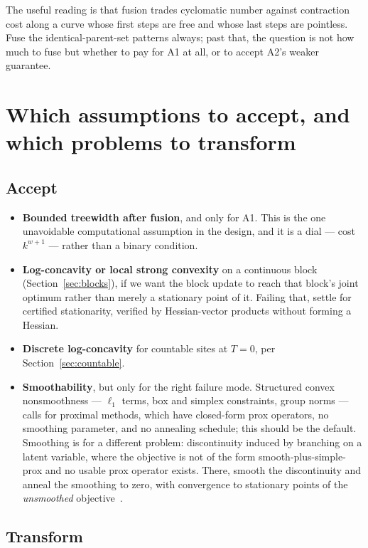 The useful reading is that fusion trades cyclomatic number against contraction cost along a curve whose first steps are free and whose last steps are pointless. Fuse the identical-parent-set patterns always; past that, the question is not how much to fuse but whether to pay for A1 at all, or to accept A2's weaker guarantee.

\section{Which assumptions to accept, and which problems to transform}
\label{sec:transform}

\subsection{Accept}

\begin{itemize}
    \item \textbf{Bounded treewidth after fusion}, and only for A1. This is the one unavoidable computational assumption in the design, and it is a dial --- cost $k^{w+1}$ --- rather than a binary condition.
    \item \textbf{Log-concavity or local strong convexity} on a continuous block (Section~\ref{sec:blocks}), if we want the block update to reach that block's joint optimum rather than merely a stationary point of it. Failing that, settle for certified stationarity, verified by Hessian-vector products without forming a Hessian.
    \item \textbf{Discrete log-concavity} for countable sites at $T = 0$, per Section~\ref{sec:countable}.
    \item \textbf{Smoothability}, but only for the right failure mode. Structured convex nonsmoothness --- $\ell_1$ terms, box and simplex constraints, group norms --- calls for proximal methods, which have closed-form prox operators, no smoothing parameter, and no annealing schedule; this should be the default. Smoothing is for a different problem: discontinuity induced by branching on a latent variable, where the objective is not of the form smooth-plus-simple-prox and no usable prox operator exists. There, smooth the discontinuity and anneal the smoothing to zero, with convergence to stationary points of the \emph{unsmoothed} objective~\citep{Wagner2024}.
\end{itemize}

\subsection{Transform}

